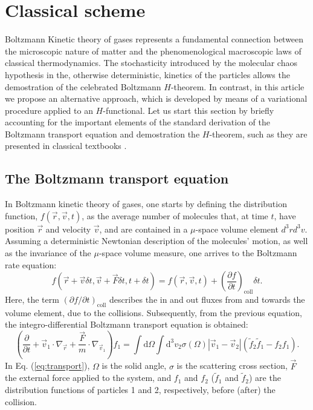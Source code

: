 \section{Classical scheme}\label{sec:classical}

Boltzmann Kinetic theory of gases represents a fundamental connection
between the microscopic nature of matter and the phenomenological macroscopic  laws of classical thermodynamics.
The stochasticity introduced by the molecular chaos hypothesis in the, otherwise deterministic, kinetics of the
particles allows the demostration 
of the celebrated Boltzmann $H$-theorem. In contrast, in this article we propose an alternative approach, which is 
developed by means of a variational procedure applied to an $H$-functional.
Let us start this section by briefly accounting for the important elements of the 
standard derivation of the Boltzmann transport equation and demostration the $H$-theorem,
such as they are presented in classical textbooks \cite{bib:huang}. 

\subsection{The Boltzmann transport equation}

In Boltzmann kinetic theory of gases, one starts by defining the distribution function, 
$f(\vec{r},\vec{v},t)$, as the average number of molecules that, at time $t$, have 
position $\vec r$ and velocity $\vec v$, and are contained in a $\mu$-space volume element $d^3rd^3v$.
Assuming a deterministic Newtonian description of the molecules' motion, 
as well as the invariance of the $\mu$-space volume measure, one arrives to the Boltzmann rate equation:
%
\begin{equation}
	f(\vec{r}+\vec{v}\delta t, \vec{v}+\vec{F} \delta t, t+\delta t)=f(\vec{r},\vec{v},t)+\left( \frac{\partial f}{\partial t} \right)_{\textrm{coll}} \delta t.
\end{equation}
%
Here, the term $\left(\partial f/\partial t\right)_{\textrm{coll}}$
describes the in and out fluxes from and towards the volume element, due to the collisions.
Subsequently, from the previous equation, the integro-differential Boltzmann transport equation is obtained:
%
\begin{equation}\label{eq:transport}
  \left(
    \frac{\partial}{\partial t}+\vec{v}_1 \cdot\nabla_{\vec r}
    +\frac{\vec{F}}{m}\cdot\nabla_{\vec v_1}
  \right)f_1=\int\mathrm{d}\Omega\int
    \mathrm{d}^{3}v_2\sigma(\Omega)|\vec{v}_1-\vec{v}_2|(\tilde f_2\tilde f_1-f_2f_1).
\end{equation}
%
In Eq. (\ref{eq:transport}), $\Omega$ is the solid angle, $\sigma$ is the
scattering cross section, $\vec F$ the
external force applied to the system, and $f_1$ and $f_2$ ($\tilde f_1$ and $\tilde f_2$) are the distribution
functions of particles 1 and 2, respectively, before (after) the collision.

